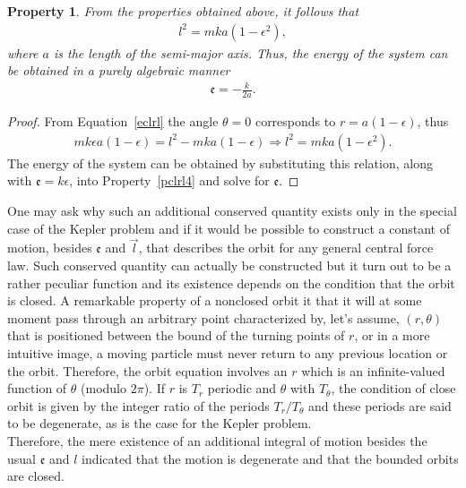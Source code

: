 \documentclass[12pt,a4paper]{report}
\newtheorem{property}{Property}[section]
\theoremstyle{definition}
\theoremstyle{remark}
\theoremstyle{remark}
\begin{document}
\begin{property}\label{pclrl5}
From the properties obtained above, it follows that
\begin{align*}
l^2=mka(1-\epsilon^2),
\end{align*}
where $a$ is the length of the semi-major axis. Thus, the energy of the system can be obtained in a purely algebraic manner
\begin{align*}
\mathfrak{e}=-\frac{k}{2a}.
\end{align*}
\end{property}
\begin{proof}
From Equation~\ref{eclrl} the angle $\theta=0$ corresponds to $r=a(1-\epsilon)$, thus
\begin{align*}
mk\epsilon a(1-\epsilon)=l^2-mka(1-\epsilon)\Rightarrow l^2=mka(1-\epsilon^2).
\end{align*}
The energy of the system can be obtained by substituting this relation, along with $\mathfrak{e}=k\epsilon$, into Property~\ref{pclrl4} and solve for $\mathfrak{e}$.
\end{proof}

One may ask why such an additional conserved quantity exists only in the special case of the Kepler problem and if it would be possible to construct a constant of motion, besides $\mathfrak{e}$ and $\vec{l}$, that describes the orbit for any general central force law. Such conserved quantity can actually be constructed but it turn out to be a rather peculiar function and its existence depends on the condition that the orbit is closed. A remarkable property of a nonclosed orbit it that it will at some moment pass through an arbitrary point characterized by, let's assume, $(r,\theta)$ that is positioned between the bound of the turning points of $r$, or in a more intuitive image, a moving particle must never return to any previous location or the orbit. Therefore, the orbit equation involves an $r$ which is an infinite-valued function of $\theta$ (modulo $2\pi$). If $r$ is $T_r$ periodic and $\theta$ with $T_{\theta}$, the condition of close orbit is given by the integer ratio of the periods $T_r/T_{\theta}$ and these periods are said to be degenerate, as is the case for the Kepler problem.  \\ \indent
Therefore, the mere existence of an additional integral of motion besides the usual $\mathfrak{e}$ and $l$ indicated that the motion is degenerate and that the bounded orbits are closed.
\end{document}
